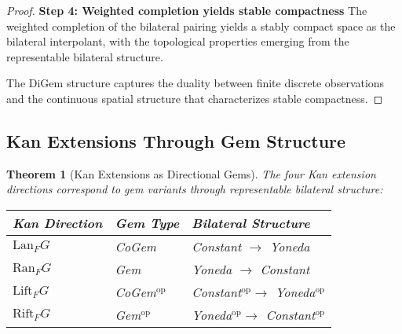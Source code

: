 \documentclass[11pt]{article}
\theoremstyle{plain}
\newtheorem{theorem}{Theorem}[section]
\theoremstyle{definition}
\theoremstyle{remark}
\newcommand{\op}{\mathrm{op}}
\begin{document}
\begin{proof}
\textbf{Step 4: Weighted completion yields stable compactness}
The weighted completion of the bilateral pairing yields a stably compact space as the bilateral interpolant, with the topological properties emerging from the representable bilateral structure.

The DiGem structure captures the duality between finite discrete observations and the continuous spatial structure that characterizes stable compactness.
\end{proof}

\subsection{Kan Extensions Through Gem Structure}

\begin{theorem}[Kan Extensions as Directional Gems]\label{thm:kan-extensions-gems}
The four Kan extension directions correspond to gem variants through representable bilateral structure:

\begin{center}
\begin{tabular}{|l|l|l|}
\hline
\textbf{Kan Direction} & \textbf{Gem Type} & \textbf{Bilateral Structure} \\
\hline
$\text{Lan}_F G$ & CoGem & Constant $\to$ Yoneda \\
$\text{Ran}_F G$ & Gem & Yoneda $\to$ Constant \\
$\text{Lift}_F G$ & CoGem$^{\op}$ & Constant$^{\op} \to$ Yoneda$^{\op}$ \\
$\text{Rift}_F G$ & Gem$^{\op}$ & Yoneda$^{\op} \to$ Constant$^{\op}$ \\
\hline
\end{tabular}
\end{center}
\end{theorem}
\end{document}
